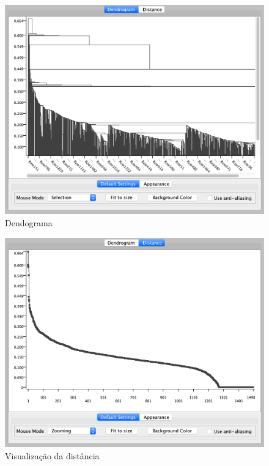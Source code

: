 \documentclass{article}
\begin{document}
\begin{figure}[H]
    \centering
    \includegraphics[scale=0.3]{Images/T7_a.png}
    \caption{Dendograma}
\end{figure}

\begin{figure}[H]
    \centering
    \includegraphics[scale=0.3]{Images/T7_b.png}
    \caption{Visualização da distância}
\end{figure}
\end{document}
